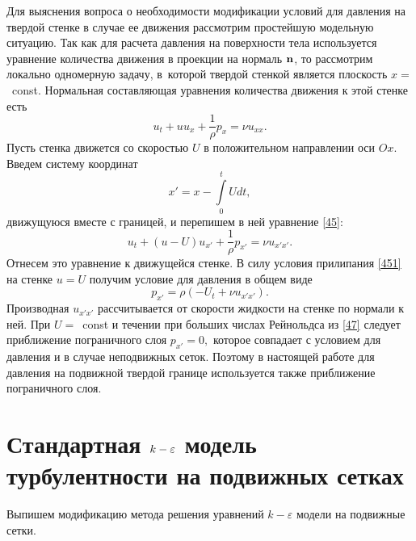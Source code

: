 Для выяснения вопроса о необходимости модификации условий для давления на твердой стенке в случае ее движения 
рассмотрим простейшую модельную ситуацию. Так как для расчета давления на поверхности тела используется 
уравнение количества движения в проекции на нормаль ${\bf{n}}$, то рассмотрим локально одномерную
задачу, в~которой твердой стенкой является плоскость $x=$~const. Нормальная составляющая уравнения количества 
движения к этой стенке есть
\begin{equation}
  \label{45} 
  u_t+uu_x+\frac{1}{\rho}p_x=\nu u_{xx}.
\end{equation}
Пусть стенка движется со скоростью $U$ в положительном направлении оси $Ox$. Введем систему координат
\begin{equation}
  x'=x-\int\limits_0^t Udt,
\end{equation}
движущуюся вместе с границей, и перепишем в ней уравнение \eqref{45}:
\begin{equation}
  \label{46} 
  u_t+(u-U)u_{x'}+\frac{1}{\rho}p_{x'}=\nu u_{x'x'}.
\end{equation}
Отнесем это уравнение к движущейся стенке. В силу условия прилипания \eqref{451} на стенке $u=U$ получим 
условие для давления в общем виде
\begin{equation}
  \label{47} 
  p_{x'}=\rho\left(-U_t+\nu u_{x'x'}\right).
\end{equation}
Производная $u_{x'x'}$ рассчитывается от скорости жидкости на стенке по нормали к ней. При $U=$~const и 
течении при больших числах Рейнольдса из \eqref{47} следует приближение пограничного слоя $p_{x'}=0,$
которое совпадает с условием для давления и в случае неподвижных сеток. Поэтому в настоящей работе для 
давления на подвижной твердой границе используется также приближение пограничного слоя.

\section{Стандартная $k-\boldmath{\varepsilon}$ модель турбулентности на подвижных сетках}
\label{s:14}
Выпишем модификацию метода решения уравнений $k-\varepsilon$ модели \cite{Cher} на подвижные сетки.

